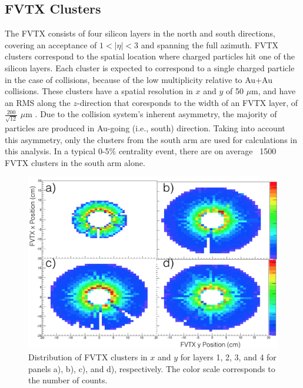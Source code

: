 \subsection{FVTX Clusters}
The FVTX consists of four silicon layers in the north and south directions, covering an acceptance of $1 < | \eta | < 3$ and spanning the full azimuth. FVTX clusters correspond to the spatial location where charged particles hit one of the silicon layers. Each cluster is expected to correspond to a single charged particle in the case of \pau collisions, because of the low multiplicity relative to Au+Au collisions. These clusters have a spatial resolution in $x$ and $y$ of 50 $\mu$m, and have an RMS along the $z$-direction that coresponds to the width of an FVTX layer, of $\frac{200}{\sqrt{12}}$ $\mu$m \cite{Aidala201444}. Due to the \pau collision system's inherent asymmetry, the majority of particles are produced in Au-going (i.e., south) direction. Taking into account this asymmetry, only the clusters from the south arm are used for calculations in this analysis. In a typical 0-5$\%$ centrality event, there are on average ~1500 FVTX clusters in the south arm alone.

\begin{figure}[!h]
\begin{center}
\includegraphics[width=0.55\linewidth]{figs/fvtx_clus_xy.png}
\caption{Distribution of FVTX clusters in $x$ and $y$ for layers 1, 2, 3, and 4 for panels a), b), c), and d), respectively. The color scale corresponds to the number of counts.}
\label{fig:dc_mom_res}
\end{center}
\end{figure}

